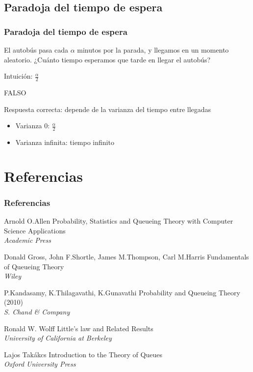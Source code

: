 \documentclass[8pt]{beamer}
\begin{document}
  \subsection{Paradoja del tiempo de espera}
  \begin{frame}\frametitle{Paradoja del tiempo de espera}
    El autobús pasa cada $\alpha$ minutos por la parada, y llegamos en un momento aleatorio. ¿Cuánto tiempo esperamos que tarde en llegar el autobús?

    Intuición:  $\frac{\alpha}{2} $
    \pause
    \begin{alertblock}{FALSO}
    \end{alertblock}

    Respuesta correcta: depende de la varianza del tiempo entre llegadas
    \begin{itemize}
    \item Varianza 0: $\frac{\alpha}{2}$
    \item Varianza infinita: tiempo infinito
    \end{itemize}
  \end{frame}

\section {Referencias}
\begin{frame}
\frametitle{Referencias}
\footnotesize{
  \begin{thebibliography}{99} %
     Arnold O.Allen
      \newblock Probability, Statistics and Queueing Theory with Computer Science Applications\\
      \newblock \emph{Academic Press}

     Donald Gross, John F.Shortle, James M.Thompson, Carl M.Harris
      \newblock Fundamentals of Queueing Theory\\
      \newblock \emph{Wiley}

     P.Kandasamy, K.Thilagavathi, K.Gunavathi
      \newblock Probability and Queueing Theory (2010)\\
      \newblock \emph{S. Chand \& Company}

     Ronald W. Wolff
      \newblock Little's law and Related Results\\
      \newblock \emph{University of California at Berkeley}

     Lajos Takákcs
      \newblock Introduction to the Theory of Queues\\
      \newblock \emph{Oxford University Press}

  \end{thebibliography}
}
\end{frame}
\end{document}

